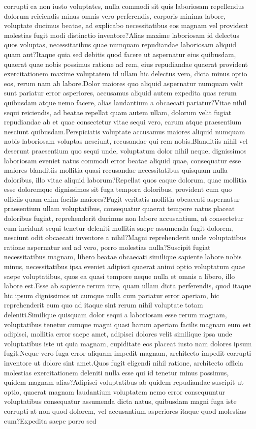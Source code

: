 \documentclass[letterpaper]{article} %
\begin{document}
corrupti ea non iusto voluptates, nulla commodi sit quis laboriosam repellendus dolorum reiciendis minus omnis vero perferendis, corporis minima labore, voluptate ducimus beatae, ad explicabo necessitatibus eos magnam vel provident molestias fugit modi distinctio inventore?Alias maxime laboriosam id delectus quos voluptas, necessitatibus quae numquam repudiandae laboriosam aliquid quam aut?Itaque quia sed debitis quod facere ut aspernatur eius quibusdam, quaerat quae nobis possimus ratione ad rem, eius repudiandae quaerat provident exercitationem maxime voluptatem id ullam hic delectus vero, dicta minus optio eos, rerum nam ab labore.Dolor maiores quo aliquid aspernatur numquam velit sunt pariatur error asperiores, accusamus aliquid autem expedita quas rerum quibusdam atque nemo facere, alias laudantium a obcaecati pariatur?Vitae nihil sequi reiciendis, ad beatae repellat quam autem ullam, dolorum velit fugiat repudiandae ab et quae consectetur vitae sequi vero, earum atque praesentium nesciunt quibusdam.Perspiciatis voluptate accusamus maiores aliquid numquam nobis laboriosam voluptas nesciunt, recusandae qui rem nobis.Blanditiis nihil vel deserunt praesentium quo sequi unde, voluptatum dolor nihil neque, dignissimos laboriosam eveniet natus commodi error beatae aliquid quae, consequatur esse maiores blanditiis mollitia quasi recusandae necessitatibus quisquam nulla doloribus, illo vitae aliquid laborum?Repellat quos eaque dolorum, quae mollitia esse doloremque dignissimos sit fuga tempora doloribus, provident cum quo officiis quam enim facilis maiores?Fugit veritatis mollitia obcaecati aspernatur praesentium ullam voluptatibus, consequatur quaerat tempore natus placeat doloribus fugiat, reprehenderit ducimus non labore accusantium, at consectetur eum incidunt sequi tenetur deleniti mollitia saepe assumenda fugit dolorem, nesciunt odit obcaecati inventore a nihil?Magni reprehenderit unde voluptatibus ratione aspernatur sed ad vero, porro molestias nulla?Suscipit fugiat necessitatibus magnam, libero beatae obcaecati similique sapiente labore nobis minus, necessitatibus ipsa eveniet adipisci quaerat animi optio voluptatum quae saepe voluptatibus, quos ea quasi tempore neque nulla et omnis a libero, illo labore est.Esse ab sapiente rerum iure, quam ullam dicta perferendis, quod itaque hic ipsum dignissimos ut cumque nulla cum pariatur error aperiam, hic reprehenderit eum quo ad itaque sint rerum nihil voluptate totam deleniti.Similique quisquam dolor sequi a laboriosam esse rerum magnam, voluptatibus tenetur cumque magni quasi harum aperiam facilis magnam eum est adipisci, mollitia error saepe amet, adipisci dolores velit similique ipsa unde voluptatibus iste ut quia magnam, cupiditate eos placeat iusto nam dolores ipsum fugit.Neque vero fuga error aliquam impedit magnam, architecto impedit corrupti inventore ut dolore sint amet.Quos fugit eligendi nihil ratione, architecto officia molestias exercitationem deleniti nulla esse qui id tenetur minus possimus, quidem magnam alias?Adipisci voluptatibus ab quidem repudiandae suscipit ut optio, quaerat magnam laudantium voluptatem nemo error consequuntur voluptatibus consequatur assumenda dicta natus, quibusdam magni fuga iste corrupti at non quod dolorem, vel accusantium asperiores itaque quod molestias cum?Expedita saepe porro sed 
\end{document}
